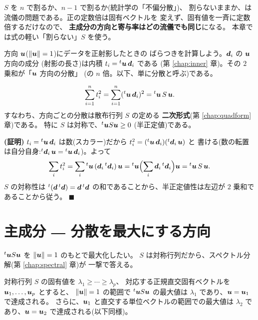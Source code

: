 \begin{chui}
$S$ を $n$ で割るか、$n - 1$ で割るか(統計学の「不偏分散」)、
割らないままか、は流儀の問題である。正の定数倍は固有ベクトルを
変えず、固有値を一斉に定数倍するだけなので、
\textbf{主成分の方向と寄与率はどの流儀でも同じ}になる。
本章では式の軽い「割らない」$S$ を使う。
\end{chui}

方向 $\bm{u}$($\|\bm{u}\| = 1$)にデータを正射影したときの
ばらつきを計算しよう。$\bm{d}_i$ の $\bm{u}$ 方向の成分
(射影の長さ)は内積 $t_i = {}^t\bm{u}\,\bm{d}_i$ である
(第 \ref{chap:inner} 章)。その $2$ 乗和が「$\bm{u}$ 方向の分散」
(の $n$ 倍。以下、単に分散と呼ぶ)である。

\begin{teiri}\label{thm:pca-quadform}
\[
\sum_{i=1}^{n} t_i^2
= \sum_{i=1}^{n} ({}^t\bm{u}\,\bm{d}_i)^2
= {}^t\bm{u}\,S\,\bm{u}.
\]
すなわち、方向ごとの分散は散布行列 $S$ の定める
\textbf{二次形式}(第 \ref{chap:quadform} 章)である。
特に $S$ は対称で、${}^t\bm{u}S\bm{u} \ge 0$
(半正定値)である。
\end{teiri}

\noindent\textbf{(証明)}\quad
$t_i = {}^t\bm{u}\,\bm{d}_i$ は数(スカラー)だから
$t_i^2 = ({}^t\bm{u}\,\bm{d}_i)({}^t\bm{d}_i\,\bm{u})$ と
書ける(数の転置は自分自身:${}^t\bm{d}_i\,\bm{u}
= {}^t\bm{u}\,\bm{d}_i$)。よって
\[
\sum_i t_i^2
= \sum_i {}^t\bm{u}\,(\bm{d}_i\,{}^t\bm{d}_i)\,\bm{u}
= {}^t\bm{u}\Bigl(\sum_i \bm{d}_i\,{}^t\bm{d}_i\Bigr)\bm{u}
= {}^t\bm{u}\,S\,\bm{u}.
\]
$S$ の対称性は ${}^t(\bm{d}\,{}^t\bm{d}) = \bm{d}\,{}^t\bm{d}$
の和であることから、半正定値性は左辺が $2$ 乗和であることから従う。
$\blacksquare$

\section{主成分 ― 分散を最大にする方向}

${}^t\bm{u}S\bm{u}$ を $\|\bm{u}\| = 1$ のもとで最大化したい。
$S$ は対称行列だから、スペクトル分解(第 \ref{chap:spectral} 章)が
一撃で答える。

\begin{teiri}[分散最大の方向は最大固有値の固有ベクトル]\label{thm:pca-max}
対称行列 $S$ の固有値を $\lambda_1 \ge \cdots \ge \lambda_p$、
対応する正規直交固有ベクトルを $\bm{u}_1, \dots, \bm{u}_p$ とすると、
$\|\bm{u}\| = 1$ の範囲で ${}^t\bm{u}S\bm{u}$ の最大値は
$\lambda_1$ であり、$\bm{u} = \bm{u}_1$ で達成される。
さらに、$\bm{u}_1$ と直交する単位ベクトルの範囲での最大値は
$\lambda_2$ であり、$\bm{u} = \bm{u}_2$ で達成される(以下同様)。
\end{teiri}

